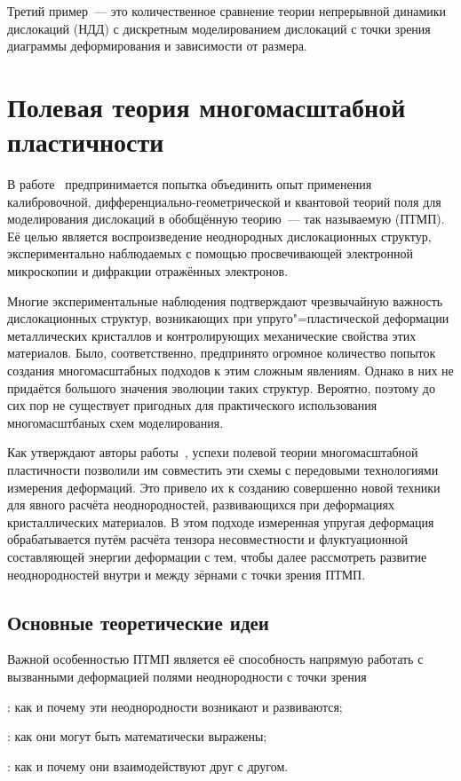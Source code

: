 \documentclass[a4paper, 14pt, titlepage]{extarticle}
\begin{document}
  Третий пример~--- это количественное сравнение теории непрерывной динамики дислокаций (НДД) с
  дискретным моделированием дислокаций с точки зрения диаграммы деформирования и зависимости от
  размера.

  \section{Полевая теория многомасштабной пластичности}

  В работе~\cite{hasebe-ftmp} предпринимается попытка объединить опыт применения калибровочной,
  дифференциально-геометрической и квантовой теорий поля для моделирования дислокаций в обобщённую
  теорию~--- так называемую  (ПТМП). Её целью
  является воспроизведение неоднородных дислокационных структур, экспериментально наблюдаемых с
  помощью просвечивающей электронной микроскопии и дифракции отражённых электронов.

  Многие экспериментальные наблюдения подтверждают чрезвычайную важность дислокационных структур,
  возникающих при упруго"=пластической деформации металлических кристаллов и контролирующих
  механические свойства этих материалов. Было, соответственно, предпринято огромное количество
  попыток создания многомасштабных подходов к этим сложным явлениям. Однако в них не придаётся
  большого значения эволюции таких структур. Вероятно, поэтому до сих пор не существует пригодных
  для практического использования многомасштбаных схем моделирования.

  Как утверждают авторы работы~\cite{hasebe-ftmp}, успехи полевой теории многомасштабной
  пластичности позволили им совместить эти схемы с передовыми технологиями измерения деформаций. Это
  привело их к созданию совершенно новой техники для явного расчёта неоднородностей, развивающихся
  при деформациях кристаллических материалов. В этом подходе измеренная упругая деформация
  обрабатывается путём расчёта тензора несовместности и флуктуационной составляющей энергии
  деформации с тем, чтобы далее рассмотреть развитие неоднородностей внутри и между зёрнами с точки
  зрения ПТМП.

  \subsection{Основные теоретические идеи}

  Важной особенностью ПТМП является её способность напрямую работать с вызванными деформацией полями
  неоднородности с точки зрения
  \begin{enumasbuk}
    \item {}: как и почему эти неоднородности возникают и развиваются; \label{enu:evol}
    \item {}: как они могут быть математически выражены; \label{enu:desc}
    \item {}: как и почему они взаимодействуют друг с другом. \label{enu:coop}
  \end{enumasbuk}
\end{document}

